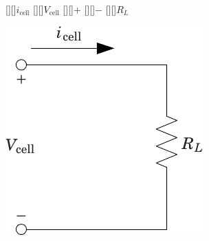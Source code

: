 [][]{$i_\text{cell}$}
[][]{$V_\text{cell}$}
\psfrag{+}[][]{$+$}
\psfrag{-}[][]{$-$}
[][]{$R_L$}

\centering
\includegraphics[width=0.75\columnwidth]{resistive_load}